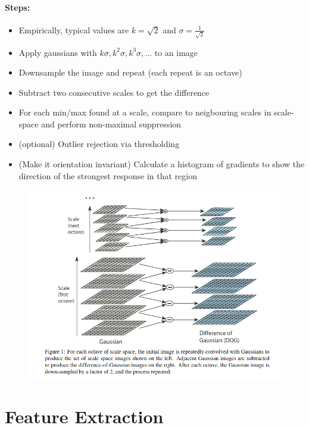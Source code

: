 \documentclass[]{article}
\begin{document}
		\paragraph{Steps:}
		\begin{itemize}
			\item Empirically, typical values are $k = \sqrt{2}$ and $\sigma=\frac{1}{\sqrt{2}}$
			\item Apply gaussians with $k\sigma, k^2\sigma, k^3\sigma, ...$ to an image
			\item Downsample the image and repeat (each repeat is an octave)
			\item Subtract two consecutive scales to get the difference
			\item For each min/max found at a scale, compare to neigbouring scales in scale-space and perform non-maximal suppression
			\item (optional) Outlier rejection via thresholding
			\item (Make it orientation invariant) Calculate a histogram of gradients to show the direction of the strongest response in that region
		\end{itemize}
	\newpage		
		\begin{figure}[h!]
			\begin{center}
				\includegraphics[width=\linewidth]{./images/sift.png}
				\label{fig:sift}
			\end{center}
		\end{figure}
	
		
\section{Feature Extraction}
\end{document}
